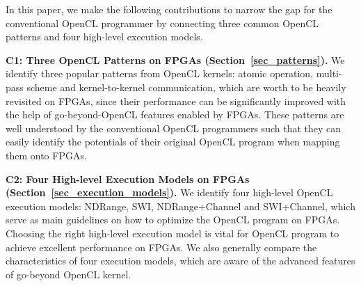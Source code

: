 In this paper, we make the following contributions to narrow the gap for the conventional OpenCL programmer by connecting three common OpenCL patterns and four high-level execution models.


\vspace{0.4em}
\noindent
{\bf C1: Three OpenCL Patterns on FPGAs (Section~\ref{sec_patterns}). }We identify three popular patterns from OpenCL kernels: atomic operation, multi-pass scheme and kernel-to-kernel communication, which are worth to be heavily revisited on FPGAs, since their performance can be significantly improved with the help of go-beyond-OpenCL features enabled by FPGAs. These patterns are well understood by the conventional OpenCL programmers such that they can easily identify the potentials of their original OpenCL program when mapping them onto FPGAs. %

\vspace{0.4em}
\noindent
{\bf C2: Four High-level Execution Models on FPGAs (Section~\ref{sec_execution_models}). }We identify four high-level OpenCL execution models: NDRange, SWI, NDRange+Channel and SWI+Channel, which serve as main guidelines on how to optimize the OpenCL program on FPGAs. Choosing the right high-level execution model is vital for OpenCL program to achieve excellent performance on FPGAs. We also generally compare the characteristics of four execution models, which are aware of the advanced features of go-beyond OpenCL kernel. 

